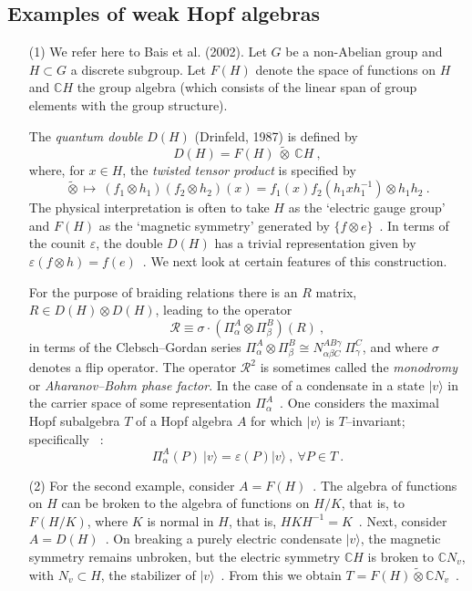 \documentclass[12pt]{article}
\theoremstyle{plain}
\theoremstyle{definition}
\numberwithin{equation}{section}
\newcommand{\bC}{\mathbb{C}}
\newcommand{\vep}{\varepsilon}
\newcommand{\wti}{\widetilde}
\renewcommand{\a}{\alpha}
\newcommand{\be}{\beta}
\newcommand{\med}{\medbreak}
\begin{document}
\subsection{Examples of weak Hopf algebras}
\begin{itemize}
\item [(1)]
We refer here to Bais et al. (2002). Let $G$ be a non-Abelian group
and $H \subset G$ a discrete subgroup. Let $F(H)$ denote the space
of functions on $H$ and $\bC H$ the group algebra (which consists
of the linear span of group elements with the group structure).

The \emph{quantum double} $D(H)$ (Drinfeld, 1987) is defined by
\begin{equation}
D(H) = F(H)~ \wti{\otimes}~ \bC H~,
\end{equation}
where, for $x \in H$, the {\em twisted tensor product} is specified by
\begin{equation}
\wti{\otimes} \mapsto ~(f_1 \otimes h_1) (f_2 \otimes h_2)(x) =
f_1(x) f_2(h_1 x h_1^{-1}) \otimes h_1 h_2 ~.
\end{equation}
The physical interpretation is often to take $H$ as the `electric gauge group' and $F(H)$ as the `magnetic symmetry' generated by $\{f \otimes e\}$~. In terms of the counit $\vep$, the double
$D(H)$ has a trivial representation given by $\vep(f \otimes h) =
f(e)$~. We next look at certain features of this construction.

\med
For the purpose of braiding relations there is an $R$ matrix, $R
\in D(H) \otimes D(H)$, leading to the operator
\begin{equation}
\mathcal R \equiv \sigma \cdot (\Pi^A_{\a} \otimes \Pi^B_{\be})
(R)~,
\end{equation}
in terms of the Clebsch--Gordan series $\Pi^A_{\a} \otimes
\Pi^B_{\be} \cong N^{AB \gamma}_{\a \be C}~ \Pi^C_{\gamma}$, and
where $\sigma$ denotes a flip operator. The operator $\mathcal
R^2$ is sometimes called the \emph{monodromy} or
\emph{Aharanov--Bohm phase factor}. In the case of a condensate in
a state $\vert v \rangle$ in the carrier space of some
representation $\Pi^A_{\a}$~. One considers the maximal Hopf
subalgebra $T$ of a Hopf algebra $A$ for which $\vert v \rangle$
is $T$--invariant; specifically ~:
\begin{equation}
\Pi^A_{\a} (P)~\vert v \rangle = \vep(P) \vert v \rangle~,~
\forall P \in T~.
\end{equation}

\med
\item[(2)]
For the second example, consider $A = F(H)$~. The algebra of
functions on $H$ can be broken to the algebra of functions on
$H/K$, that is, to $F(H/K)$, where $K$ is normal in $H$, that is,
$HKH^{-1} =K$~. Next, consider $A = D(H)$~. On breaking a purely
electric condensate $\vert v \rangle$, the magnetic symmetry
remains unbroken, but the electric symmetry $\bC H$ is broken to
$\bC N_v$, with $N_v \subset H$, the stabilizer of $\vert v
\rangle$~. From this we obtain $T = F(H) \wti{\otimes} \bC N_v$~.


\end{itemize}
\end{document}
